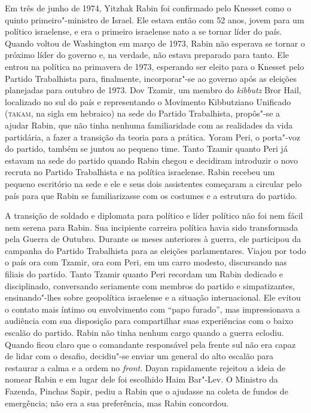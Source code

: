 Em três de junho de 1974, Yitzhak Rabin foi confirmado pelo Knesset como
o quinto primeiro"-ministro de Israel. Ele estava então com 52
anos, jovem para um político israelense, e era o primeiro israelense
nato a se tornar líder do país. Quando voltou de Washington em março de
1973, Rabin não esperava se tornar o próximo líder do governo e, na
verdade, não estava preparado para tanto. Ele entrou na política na
primavera de 1973, esperando ser eleito para o Knesset pelo Partido
Trabalhista para, finalmente, incorporar"-se ao governo após as eleições
planejadas para outubro de 1973. Dov Tzamir, um membro do \textit{kibbutz} Bror
Hail, localizado no sul do país e representando o Movimento Kibbutziano Unificado
(\textsc{takam}, na sigla em hebraico) na sede do Partido
Trabalhista, propôs"-se a ajudar Rabin, que não tinha nenhuma
familiaridade com as realidades da vida partidária, a fazer a transição
da teoria para a prática. Yoram Peri, o porta"-voz do partido, também se
juntou ao pequeno time. Tanto Tzamir quanto Peri já estavam na sede do
partido quando Rabin chegou e decidiram introduzir o novo recruta no
Partido Trabalhista e na política israelense. Rabin recebeu um pequeno
escritório na sede e ele e seus dois assistentes começaram a circular
pelo país para que Rabin se familiarizasse com os costumes e a estrutura
do partido.

A transição de soldado e diplomata para político e líder
político não foi nem fácil nem serena para Rabin. Sua incipiente carreira política
havia sido transformada pela Guerra de Outubro. Durante os meses
anteriores à guerra, ele participou da campanha do Partido Trabalhista
para as eleições parlamentares. Viajou por todo o país ora com Tzamir, ora com
Peri, em um carro modesto, discursando nas filiais do partido. Tanto
Tzamir quanto Peri recordam um Rabin dedicado e disciplinado,
conversando seriamente com membros do partido e simpatizantes,
ensinando"-lhes sobre geopolítica israelense e a situação internacional.
Ele evitou o contato mais íntimo ou envolvimento com ``papo furado'', mas
impressionava a audiência com sua disposição para compartilhar suas
experiências com o baixo escalão do partido. Rabin não tinha nenhum
cargo quando a guerra eclodiu. Quando ficou claro que o comandante
responsável pela frente sul não era capaz de lidar com o desafio,
decidiu"-se enviar um general do alto escalão para restaurar a calma e a
ordem no \textit{front}. Dayan rapidamente rejeitou a ideia de nomear Rabin e em
lugar dele foi escolhido Haim Bar"-Lev. O Ministro da Fazenda, Pinchas
Sapir, pediu a Rabin que o ajudasse na coleta de fundos de emergência;
não era a sua preferência, mas Rabin concordou.

